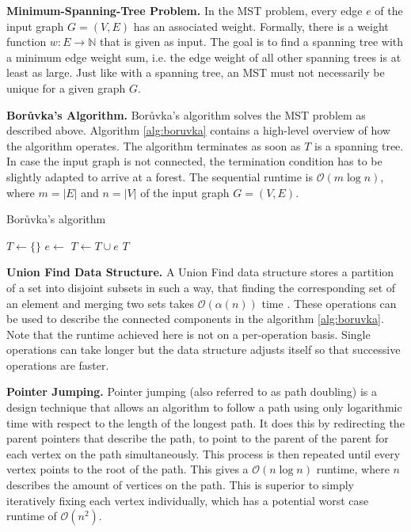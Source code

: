 \documentclass[letterpaper]{article}
\newcommand{\N}[0]{\mathbb{N}}
\newcommand{\bigoh}{\mathcal O}
\newcommand{\mypar}[1]{{\bf #1.}}
\begin{document}
\mypar{Minimum-Spanning-Tree Problem}
In the \linebreak MST problem, every edge $e$ of the input graph $G = (V, E)$ has an associated weight. Formally, there
is a weight function $w : E \to \N$ that is given as input. The goal is to find a spanning tree with a minimum edge
weight sum, i.e. the edge weight of all other spanning trees is at least as large. Just like with a spanning tree, an
MST must not necessarily be unique for a given graph $G$.

\mypar{Bor\r{u}vka's Algorithm}
Bor\r{u}vka's algorithm \cite{boruuvka1926jistem, nevsetvril2001otakar} solves the MST problem as described above.
Algorithm \ref{alg:boruvka} contains a high-level overview of how the algorithm operates. The algorithm terminates as
soon as $T$ is a spanning tree. In case the input graph is not connected, the termination condition has to be slightly
adapted to arrive at a forest. The sequential runtime is $\bigoh(m \log n)$, where $m = |E|$ and $n = |V|$ of the input
graph $G = (V, E)$.

\begin{algorithm}[!t]
  \caption{Bor\r{u}vka's algorithm}
  \label{alg:boruvka}
  \begin{algorithmic}
    \State $T \gets \{ \}$
        \State $e \gets$ 
        \State $T \gets T \cup e$
      \EndFor
      \State {}
    \EndWhile
    \State \Return $T$
  \end{algorithmic}
\end{algorithm}

\mypar{Union Find Data Structure}
A Union Find data structure stores a partition of a set into disjoint subsets in such a way, that finding the
corresponding set of an element and merging two sets takes $\bigoh(\alpha(n))$ time \cite{efficiency_union_find}. These
operations can be used to describe the connected components in the algorithm \ref{alg:boruvka}. Note that the runtime
achieved here is not on a per-operation basis. Single operations can take longer but the data structure adjusts itself
so that successive operations are faster.

\mypar{Pointer Jumping}
Pointer jumping \cite{jeje1992introduction} (also referred to as path doubling) is a design technique that allows an
algorithm to follow a path using only logarithmic time with respect to the length of the longest path. It does this by
redirecting the parent pointers that describe the path, to point to the parent of the parent for each vertex on the path
simultaneously. This process is then repeated until every vertex points to the root of the path. This gives a $\bigoh(n
\log n)$ runtime, where $n$ describes the amount of vertices on the path. This is superior to simply iteratively fixing
each vertex individually, which has a potential worst case runtime of $\bigoh(n^2)$.
\end{document}
